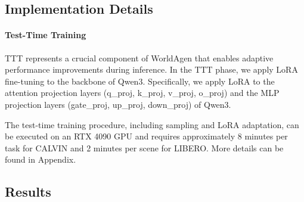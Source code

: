 \subsection{Implementation Details}

\paragraph{Test-Time Training} TTT represents a crucial component of WorldAgen that enables adaptive performance improvements during inference. In the TTT phase, we apply LoRA fine-tuning to the backbone of Qwen3. Specifically, we apply LoRA to the attention projection layers (q\_proj, k\_proj, v\_proj, o\_proj) and the MLP projection layers (gate\_proj, up\_proj, down\_proj) of Qwen3.

The test-time training procedure, including sampling and LoRA adaptation, can be executed on an RTX 4090 GPU and requires approximately 8 minutes per task for CALVIN and 2 minutes per scene for LIBERO. More details can be found in Appendix.

\subsection{Results}
\label{sec:main_results}

